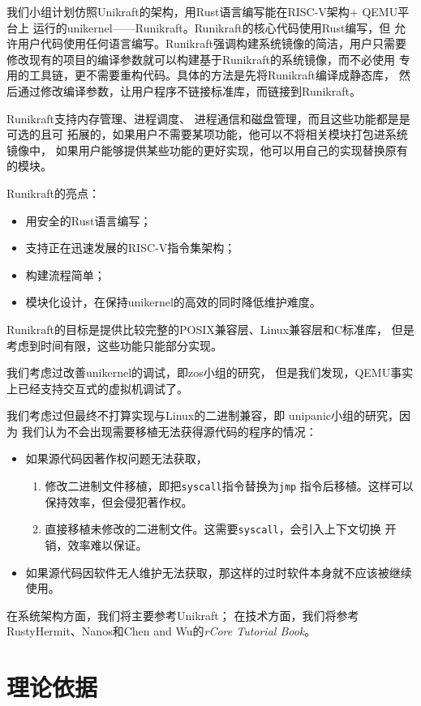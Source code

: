 \documentclass{../runikraft-report}
\begin{document}
我们小组计划仿照Unikraft的架构，用Rust语言编写能在RISC-V架构+ QEMU平台上
运行的unikernel——Runikraft。Runikraft的核心代码使用Rust编写，但
允许用户代码使用任何语言编写。Runikraft强调构建系统镜像的简洁，用户只需要
修改现有的项目的编译参数就可以构建基于Runikraft的系统镜像，而不必使用
专用的工具链，更不需要重构代码。具体的方法是先将Runikraft编译成静态库，
然后通过修改编译参数，让用户程序不链接标准库，而链接到Runikraft。

Runikraft支持内存管理、进程调度、
进程通信和磁盘管理，而且这些功能都是是可选的且可
拓展的，如果用户不需要某项功能，他可以不将相关模块打包进系统镜像中，
如果用户能够提供某些功能的更好实现，他可以用自己的实现替换原有的模块。

Runikraft的亮点：
\begin{itemize}
\item 用安全的Rust语言编写；
\item 支持正在迅速发展的RISC-V指令集架构；
\item 构建流程简单；
\item 模块化设计，在保持unikernel的高效的同时降低维护难度。
\end{itemize}

Runikraft的目标是提供比较完整的POSIX兼容层、Linux兼容层和C标准库，
但是考虑到时间有限，这些功能只能部分实现。

我们考虑过改善unikernel的调试，即zos小组的研究，
但是我们发现，QEMU事实上已经支持交互式的虚拟机调试了。

我们考虑过但最终不打算实现与Linux的二进制兼容，即
unipanic小组的研究，因为
我们认为不会出现需要移植无法获得源代码的程序的情况：
\begin{itemize}
\item 如果源代码因著作权问题无法获取，
    \begin{enumerate}
    \item 修改二进制文件移植，即把\texttt{syscall}指令替换为\texttt{jmp}
    指令后移植。这样可以保持效率，但会侵犯著作权。
    \item 直接移植未修改的二进制文件。这需要\texttt{syscall}，会引入上下文切换
    开销，效率难以保证。
    \end{enumerate}
\item 如果源代码因软件无人维护无法获取，那这样的过时软件本身就不应该被继续使用。
\end{itemize}

在系统架构方面，我们将主要参考Unikraft；
在技术方面，我们将参考RustyHermit、Nanos和Chen and Wu的\textit{rCore Tutorial Book}\cite{bib:rcore-os}。

\section{理论依据}
\end{document}
